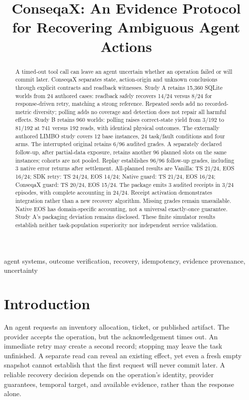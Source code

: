 \documentclass[conference]{IEEEtran}
\title{ConseqaX: An Evidence Protocol for Recovering Ambiguous Agent Actions}
\author{\IEEEauthorblockN{Devrajsinh Jhala}\IEEEauthorblockA{Independent Researcher}}
\begin{document}
\raggedbottom
\maketitle

\begin{abstract}
A timed-out tool call can leave an agent uncertain whether an operation failed or will commit later. ConseqaX separates state, action-origin and unknown conclusions through explicit contracts and readback witnesses. Study A retains 15,360 SQLite worlds from 24 authored cases: readback safely recovers 14/24 versus 8/24 for response-driven retry, matching a strong reference. Repeated seeds add no recorded-metric diversity; polling adds no coverage and detection does not repair all harmful effects. Study B retains 960 worlds: polling raises correct-state yield from 3/192 to 81/192 at 741 versus 192 reads, with identical physical outcomes. The externally authored LIMBO study covers 12 base instances, 24 task/fault conditions and four arms. The interrupted original retains 6/96 audited grades. A separately declared follow-up, after partial-data exposure, retains another 96 planned slots on the same instances; cohorts are not pooled. Replay establishes 96/96 follow-up grades, including 3 native error returns after settlement. All-planned results are Vanilla: TS 21/24, EOS 16/24; SDK retry: TS 24/24, EOS 14/24; Native guard: TS 21/24, EOS 16/24; ConseqaX guard: TS 20/24, EOS 15/24. The package emits 3 audited receipts in 3/24 episodes, with complete accounting in 24/24. Receipt activation demonstrates integration rather than a new recovery algorithm. Missing grades remain unavailable. Native EOS has domain-specific accounting, not a universal exactly-once guarantee. Study A's packaging deviation remains disclosed. These finite simulator results establish neither task-population superiority nor independent service validation.
\end{abstract}
\begin{IEEEkeywords}agent systems, outcome verification, recovery, idempotency, evidence provenance, uncertainty\end{IEEEkeywords}

\section{Introduction}

An agent requests an inventory allocation, ticket, or published artifact. The provider accepts the operation, but the acknowledgement times out. An immediate retry may create a second record; stopping may leave the task unfinished. A separate read can reveal an existing effect, yet even a fresh empty snapshot cannot establish that the first request will never commit later. A reliable recovery decision depends on the operation's identity, provider guarantees, temporal target, and available evidence, rather than the response alone.
\end{document}
